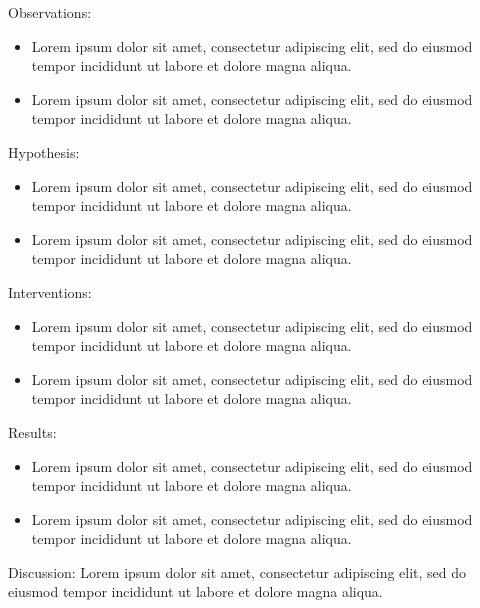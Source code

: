\documentclass[a4paper,12pt]{memoir}
\begin{document}
Observations:
\begin{itemize}
\item Lorem ipsum dolor sit amet, consectetur adipiscing elit, sed do eiusmod tempor incididunt ut labore et dolore magna aliqua.
\item Lorem ipsum dolor sit amet, consectetur adipiscing elit, sed do eiusmod tempor incididunt ut labore et dolore magna aliqua. 
\end{itemize}
Hypothesis:
\begin{itemize}
\item Lorem ipsum dolor sit amet, consectetur adipiscing elit, sed do eiusmod tempor incididunt ut labore et dolore magna aliqua.
\item Lorem ipsum dolor sit amet, consectetur adipiscing elit, sed do eiusmod tempor incididunt ut labore et dolore magna aliqua. 
\end{itemize}
Interventions:
\begin{itemize}
\item Lorem ipsum dolor sit amet, consectetur adipiscing elit, sed do eiusmod tempor incididunt ut labore et dolore magna aliqua.
\item Lorem ipsum dolor sit amet, consectetur adipiscing elit, sed do eiusmod tempor incididunt ut labore et dolore magna aliqua. 
\end{itemize}
Results:
\begin{itemize}
\item Lorem ipsum dolor sit amet, consectetur adipiscing elit, sed do eiusmod tempor incididunt ut labore et dolore magna aliqua.
\item Lorem ipsum dolor sit amet, consectetur adipiscing elit, sed do eiusmod tempor incididunt ut labore et dolore magna aliqua. 
\end{itemize}
Discussion: Lorem ipsum dolor sit amet, consectetur adipiscing elit, sed do eiusmod tempor incididunt ut labore et dolore magna aliqua.\\
\end{document}
